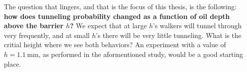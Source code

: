 The question that lingers, and that is the focus of this thesis, is the following: \textbf{how does tunneling probability changed as a function of oil depth above the barrier $h$?} We expect that at large $h$'s walkers will tunnel through very frequently, and at small $h$'s there will be very little tunneling. What is the critial height where we see both behaviors? An experiment with a value of $h = 1.1~\mathrm{mm}$, as performed in the aformentioned study, would be a good starting place. 